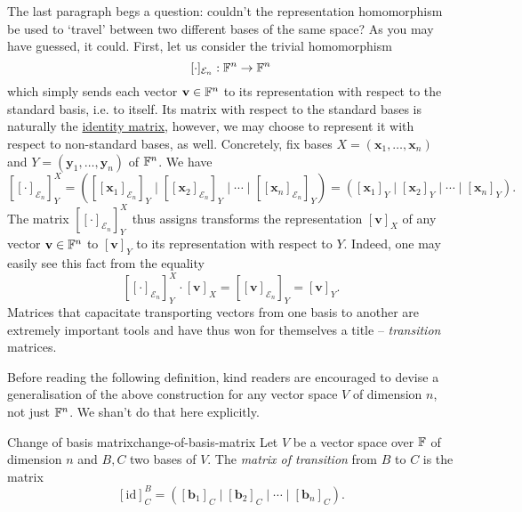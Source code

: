 The last paragraph begs a question: couldn't the representation homomorphism be
used to `travel' between two different bases of the same space? As you may have
guessed, it could. First, let us consider the trivial homomorphism
\[
 [ \cdot ]_{\mathcal{E}_n}:\mathbb{F}^{n} \to \mathbb{F}^{n}
\]
which simply sends each vector $\mathbf{v} \in \mathbb{F}^{n}$ to its representation
with respect to the standard basis, i.e. to itself. Its matrix with respect to
the standard bases is naturally the \hyperref[def:identity-matrix]{identity
matrix}, however, we may choose to represent it with respect to non-standard
bases, as well. Concretely, fix bases $X = (\mathbf{x}_1,\ldots,\mathbf{x}_n)$
and $Y = (\mathbf{y}_1,\ldots,\mathbf{y}_n)$ of $\mathbb{F}^{n}$. We have
\[
 \left[ [ \cdot ]_{\mathcal{E}_n} \right]^{X}_Y = 
 \left( 
  [[\mathbf{x}_1]_{\mathcal{E}_n}]_Y \mid [[\mathbf{x}_2]_{\mathcal{E}_n}]_Y
  \mid \cdots \mid [[\mathbf{x}_n]_{\mathcal{E}_n}]_Y
 \right) = \left( 
  [\mathbf{x}_1]_Y \mid [\mathbf{x}_2]_Y \mid \cdots \mid [\mathbf{x}_n]_Y
 \right).
\]
The matrix $[[ \cdot ]_{\mathcal{E}_n}]_Y^{X}$ thus assigns transforms the
representation $[\mathbf{v}]_X$ of any vector $\mathbf{v} \in \mathbb{F}^{n}$ to
$[\mathbf{v}]_Y$ to its representation with respect to $Y$. Indeed, one may
easily see this fact from the equality
\[
 [[ \cdot ]_{\mathcal{E}_n}]_{Y}^{X} \cdot [\mathbf{v}]_X =
 [[\mathbf{v}]_{\mathcal{E}_n}]_Y = [\mathbf{v}]_Y.
\]
Matrices that capacitate transporting vectors from one basis to another are
extremely important tools and have thus won for themselves a title --
\emph{transition} matrices.

Before reading the following definition, kind readers are encouraged to devise a
generalisation of the above construction for any vector space $V$ of dimension
$n$, not just $\mathbb{F}^{n}$. We shan't do that here explicitly.

\begin{definition}{Change of basis matrix}{change-of-basis-matrix}
 Let $V$ be a vector space over $\mathbb{F}$ of dimension $n$ and $B,C$ two bases of
 $V$. The \emph{matrix of transition} from $B$ to $C$ is the matrix
 \[
  [\mathrm{id}]_{C}^{B} = \left( [\mathbf{b}_1]_C \mid [\mathbf{b}_2]_C \mid
  \cdots \mid [\mathbf{b}_n]_C \right).
 \]
\end{definition}

